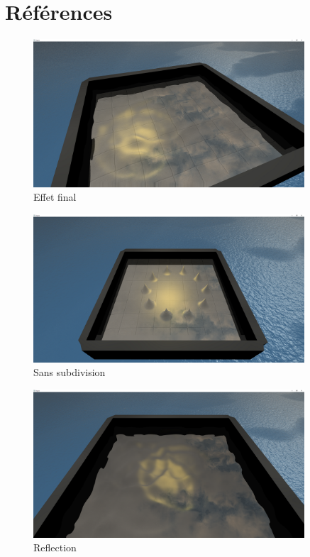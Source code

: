 \documentclass[a4paper, 12pt]{article} %
\begin{document}
\section*{Références}
\begin{figure}
	\centering
	\includegraphics[width=0.9\textwidth]{./PhotoRapport/EffetFinal.png}
	\caption{Effet final}
	\label{EffetFinal}
\end{figure}
\begin{figure}
	\centering
	\includegraphics[width=0.9\textwidth]{./PhotoRapport/NoSubdivide.png}
	\caption{Sans subdivision}
	\label{NoSubdivide}
\end{figure}
\begin{figure}
	\centering
	\includegraphics[width=0.9\textwidth]{./PhotoRapport/Reflection.png}
	\caption{Reflection}
	\label{Reflection}
\end{figure}
\end{document}
